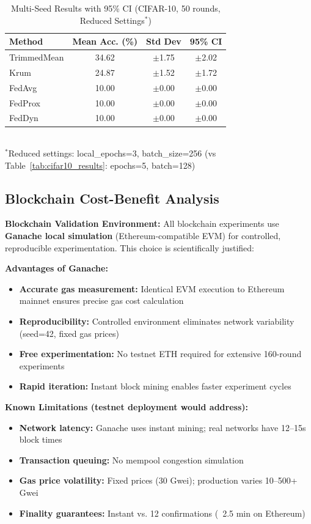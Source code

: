 \documentclass{ieeeaccess}
\begin{document}
\begin{table}[t]
\caption{Multi-Seed Results with 95\% CI (CIFAR-10, 50 rounds, Reduced Settings$^*$)}
\label{tab:multiseed_ci}
\centering
\begin{tabular}{lccc}
\toprule
\textbf{Method} & \textbf{Mean Acc. (\%)} & \textbf{Std Dev} & \textbf{95\% CI} \\
\midrule
TrimmedMean & 34.62 & $\pm$1.75 & $\pm$2.02 \\
Krum & 24.87 & $\pm$1.52 & $\pm$1.72 \\
FedAvg & 10.00 & $\pm$0.00 & $\pm$0.00 \\
FedProx & 10.00 & $\pm$0.00 & $\pm$0.00 \\
FedDyn & 10.00 & $\pm$0.00 & $\pm$0.00 \\
\bottomrule
\end{tabular}
\\[0.1cm]
\small $^*$Reduced settings: local\_epochs=3, batch\_size=256 (vs Table~\ref{tab:cifar10_results}: epochs=5, batch=128)
\end{table}

\subsection{Blockchain Cost-Benefit Analysis}

\textbf{Blockchain Validation Environment:} All blockchain experiments use \textbf{Ganache local simulation} (Ethereum-compatible EVM) for controlled, reproducible experimentation. This choice is scientifically justified:

\textbf{Advantages of Ganache:}
\begin{itemize}
    \item \textbf{Accurate gas measurement:} Identical EVM execution to Ethereum mainnet ensures precise gas cost calculation
    \item \textbf{Reproducibility:} Controlled environment eliminates network variability (seed=42, fixed gas prices)
    \item \textbf{Free experimentation:} No testnet ETH required for extensive 160-round experiments
    \item \textbf{Rapid iteration:} Instant block mining enables faster experiment cycles
\end{itemize}

\textbf{Known Limitations (testnet deployment would address):}
\begin{itemize}
    \item \textbf{Network latency:} Ganache uses instant mining; real networks have 12--15s block times
    \item \textbf{Transaction queuing:} No mempool congestion simulation
    \item \textbf{Gas price volatility:} Fixed prices (30 Gwei); production varies 10--500+ Gwei
    \item \textbf{Finality guarantees:} Instant vs. 12 confirmations (~2.5 min on Ethereum)
\end{itemize}
\end{document}
